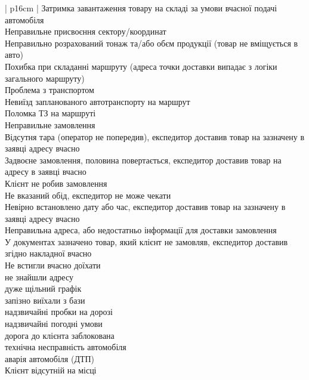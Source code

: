 \begin{mytable*}{ | p{16cm} | }
	\nopagebreak\quad Затримка завантаження товару на складі за умови вчасної подачі автомобіля \\
	\nopagebreak\quad Неправильне присвоєння сектору/координат \\
	\nopagebreak\quad Неправильно розрахований тонаж та/або обєм продукції (товар не вміщується в авто) \\
	\nopagebreak\quad Похибка при складанні маршруту (адреса точки доставки випадає з логіки загального маршруту) \\
	\hline
	Проблема з транспортом \\
	\nopagebreak\quad Невиїзд запланованого автотранспорту на маршрут \\
	\nopagebreak\quad Поломка ТЗ на маршруті \\
	\hline
	Неправильне замовлення \\
	\nopagebreak\quad Відсутня тара (оператор не попередив), експедитор доставив товар на зазначену в заявці адресу вчасно \\
	\nopagebreak\quad Задвоєне замовлення, половина повертається, експедитор доставив товар на адресу в заявці вчасно \\
	\nopagebreak\quad Клієнт не робив замовлення \\
	\nopagebreak\quad Не вказаний обід, експедитор не може чекати \\
	\nopagebreak\quad Невірно встановлено дату або час, експедитор доставив товар на зазначену в заявці адресу вчасно \\
	\nopagebreak\quad Неправильна адреса, або недостатньо інформації для доставки замовлення \\
	\nopagebreak\quad У документах зазначено товар, який клієнт не замовляв, експедитор доставив згідно накладної вчасно \\
	\hline
	Не встигли вчасно доїхати \\
	\hline
	не знайшли адресу \\
	\hline
	дуже щільний графік \\
	\hline
	запізно виїхали з бази \\
	\hline
	надзвичайні пробки на дорозі \\
	\hline
	надзвичайні погодні умови  \\
	\hline
	дорога до клієнта заблокована \\
	\hline
	технічна несправність автомобіля  \\
	\hline
	аварія автомобіля (ДТП) \\
	\hline
	Клієнт відсутній на місці \\

\end{mytable*}
